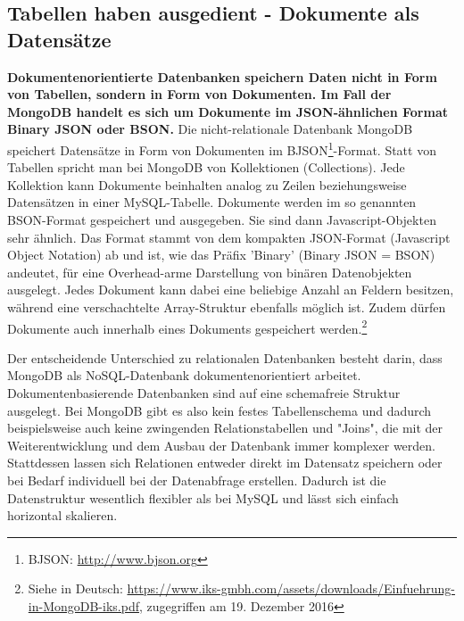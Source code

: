 \subsection{Tabellen haben ausgedient - Dokumente als Datensätze}
\textbf{ Dokumentenorientierte Datenbanken speichern Daten nicht in Form von Tabellen, sondern in Form von Dokumenten. Im Fall der MongoDB handelt es sich um Dokumente im JSON-ähnlichen Format Binary JSON oder BSON.}
Die nicht-relationale Datenbank MongoDB speichert Datensätze in Form von Dokumenten im BJSON\footnote{BJSON: \url{http://www.bjson.org}}-Format. Statt von Tabellen spricht man bei MongoDB von Kollektionen (Collections). Jede Kollektion kann Dokumente beinhalten analog zu Zeilen beziehungsweise Datensätzen in einer MySQL-Tabelle. Dokumente werden im so genannten BSON-Format gespeichert und ausgegeben. Sie sind dann Javascript-Objekten sehr ähnlich. Das Format stammt von dem kompakten JSON-Format (Javascript Object Notation) ab und ist, wie das Präfix 'Binary' (Binary JSON = BSON) andeutet, für eine Overhead-arme Darstellung von binären Datenobjekten ausgelegt. Jedes Dokument kann dabei eine beliebige Anzahl an Feldern besitzen, während eine verschachtelte Array-Struktur ebenfalls möglich ist. Zudem dürfen Dokumente auch innerhalb eines Dokuments gespeichert werden.\footnote{Siehe in Deutsch: \url{https://www.iks-gmbh.com/assets/downloads/Einfuehrung-in-MongoDB-iks.pdf}, zugegriffen am 19. Dezember 2016}

Der entscheidende Unterschied zu relationalen Datenbanken besteht darin, dass MongoDB als NoSQL-Datenbank dokumentenorientiert arbeitet. Dokumentenbasierende Datenbanken sind auf eine schemafreie Struktur ausgelegt. Bei MongoDB gibt es also kein festes Tabellenschema und dadurch beispielsweise auch keine zwingenden Relationstabellen und "Joins", die mit der Weiterentwicklung und dem Ausbau der Datenbank immer komplexer werden. Stattdessen lassen sich Relationen entweder direkt im Datensatz speichern oder bei Bedarf individuell bei der Datenabfrage erstellen. Dadurch ist die Datenstruktur wesentlich flexibler als bei MySQL und lässt sich einfach horizontal skalieren.

